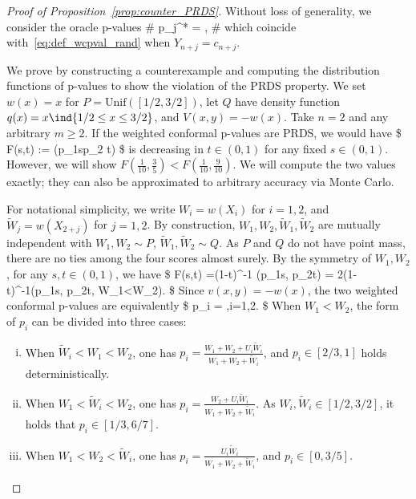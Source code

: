 \begin{proof}[Proof of Proposition~\ref{prop:counter_PRDS}]
  Without loss of generality, we consider the oracle p-values
  \#\label{eq:orc_w_pval}
p_j^* = ,
\#
which
coincide with~\eqref{eq:def_wcpval_rand} when $Y_{n+j}=c_{n+j}$.

We prove by constructing a counterexample and computing
the distribution functions of p-values to show the violation of
the PRDS property.
We set $w(x)=x$ for $P=\textrm{Unif}([1/2,3/2])$, let $Q$
have density function $q(x)=x\ind\{1/2\leq x\leq 3/2\}$,
and $V(x,y) = -w(x)$.
Take $n=2$ and any arbitrary $m\geq 2$.
If the weighted conformal p-values are PRDS, we would have
\$
F(s,t) := \PP(p_1\leq s\given p_2 \geq t)
\$
is decreasing in $t\in (0,1)$ for any fixed $s\in (0,1)$.
However, we will show $F(\frac{1}{10},\frac{3}{5}) < F(\frac{1}{10},\frac{9}{10})$.
We will compute the two values exactly;
they can also be approximated to arbitrary accuracy
via Monte Carlo.


For notational simplicity, we write $W_i=w(X_i)$ for $i=1,2$,
and $\tilde{W}_j = w(X_{2+j})$ for $j=1,2$.
By construction, $W_1,W_2,\tilde{W}_1,\tilde{W}_2$ are mutually independent with
$W_1,W_2\sim P$, $\tilde{W}_1,\tilde{W}_2\sim Q$.
As $P$ and $Q$ do not have point mass,
there are no ties among the four scores almost surely.
By the symmetry of $W_1,W_2$, for any $s,t\in (0,1)$, we have
\$
F(s,t) =(1-t)^{-1} \cdot  \PP(p_1\leq s, p_2\geq t)
= 2(1-t)^{-1}\cdot \PP(p_1\leq s, p_2\geq t, W_1<W_2).
\$
Since $v(x,y) = -w(x)$, the two weighted conformal p-values are equivalently
\$
p_i = ,\quad i=1,2.
\$
When $W_1<W_2$, the form of $p_i$ can be divided into three cases:
\begin{enumerate}[(i)]
    \item When $\tilde{W}_i<W_1<W_2$, one has $p_i = \frac{W_1+W_2+U_i\tilde{W}_i}{W_1+W_2+\tilde{W}_i}$, and  $ p_i \in[2/3, 1]$ holds deterministically.
    \item When $W_1<\tilde{W}_i<W_2$, one has $p_i = \frac{ W_2+U_i\tilde{W}_i}{W_1+W_2+\tilde{W}_i}$. As $W_i,\tilde{W}_i\in [1/2,3/2]$, it holds that $p_i\in[1/3,6/7]$.
    \item When $W_1<W_2<\tilde{W}_i$, one has $p_i = \frac{ U_i\tilde{W}_i}{W_1+W_2+\tilde{W}_i}$, and $p_i\in [0,3/5]$.
\end{enumerate}


\end{proof}
